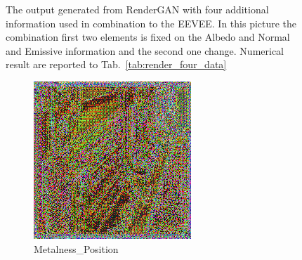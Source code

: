 \begin{figure}[h!]
    \caption[Generation Result with fixed input on Albedo and Normal]{The output generated from RenderGAN with four additional information used in combination to the EEVEE. In this picture the combination first two elements is fixed on the Albedo and Normal and Emissive information and the second one change. Numerical result are reported to Tab.~\ref{tab:render_four_data}}
    \label{fig:quadruple_input_base_albedo_normal}
\end{figure}

\begin{figure}[h!]
    \centering
    \begin{subfigure}[b]{0.175\textwidth}
     \includegraphics[width=\textwidth]{figures/result/quadruple/normal_emissive_metalness_position/1.png}
     \caption{Metalness_Position}\label{subfig:1}
    \end{subfigure}
    ~
    \begin{subfigure}[b]{0.175\textwidth}

\end{subfigure}
\end{figure}
